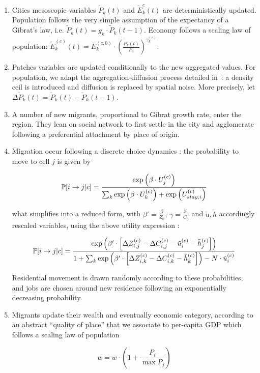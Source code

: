 \begin{enumerate}
\item Cities mesoscopic variables $\tilde{P}_k(t)$ and $\tilde{E}_k^{c}(t)$ are deterministically updated. Population follows the very simple assumption of the expectancy of a Gibrat's law, i.e. $\tilde{P}_k(t)= g_k \cdot \tilde{P}_k(t-1)$. Economy follows a scaling law of population: $\tilde{E}_k^{(c)}(t) = E_k^{(c,0)}\cdot \left(\frac{\tilde{P}_k(t)}{P_0}\right)^{\gamma_k^{(c)}}$.

\item Patches variables are updated conditionally to the new aggregated values. For population, we adapt the aggregation-diffusion process detailed in~\cite{raimbault2016calibration}: a density ceil is introduced and diffusion is replaced by spatial noise. More precisely, let $\Delta \tilde{P}_k(t) = \tilde{P}_k(t) - \tilde{P}_k(t-1)$.

\item A number of new migrants, proportional to Gibrat growth rate, enter the region. They lean on social network %
to first settle in the city and agglomerate following a preferential attachment by place of origin.
\item Migration occur following a discrete choice dynamics : the probability to move to cell $j$ is given by

\[
\operatorname{\mathbb{P}}\!\left[i\rightarrow j | c\right] = \frac{\exp{\left(\beta\cdot U_j^{(c)}\right)}}{\sum_k \exp{\left(\beta\cdot U_k^{(c)}\right)}+\exp{\left(U_{stay,i}^{(c)}\right)}}
\]

what simplifies into a reduced form, with $\beta' = \frac{\beta}{Z_0}$, $\gamma = \frac{Z_0}{C_0}$ and $\tilde{u},\tilde{h}$ accordingly rescaled variables, using the above utility expression :

\[
\operatorname{\mathbb{P}}\!\left[i\rightarrow j | c\right] = \frac{\exp{\left(\beta'\cdot \left[\Delta Z_{i,j}^{(c)} - \Delta C_{i,j}^{(c)} - \tilde{u}_i^{(c)} - \tilde{h}_j^{(c)} \right] \right)}}{1 + \sum_k {\exp{\left(\beta'\cdot \left[\Delta Z_{i,k}^{(c)} - \Delta C_{i,k}^{(c)} - \tilde{h}_k^{(c)} \right] \right)} - N\cdot \tilde{u}_i^{(c)}}}
\]

Residential movement is drawn randomly according to these probabilities, and jobs are chosen around new residence following an exponentially decreasing probability.

\item Migrants update their wealth and eventually economic category, according to an abstract ``quality of place'' that we associate to per-capita GDP which follows a scaling law of population


\[
w = w\cdot \left( 1 + \frac{P_i}{\max P_j} \right)
\]

\end{enumerate}


